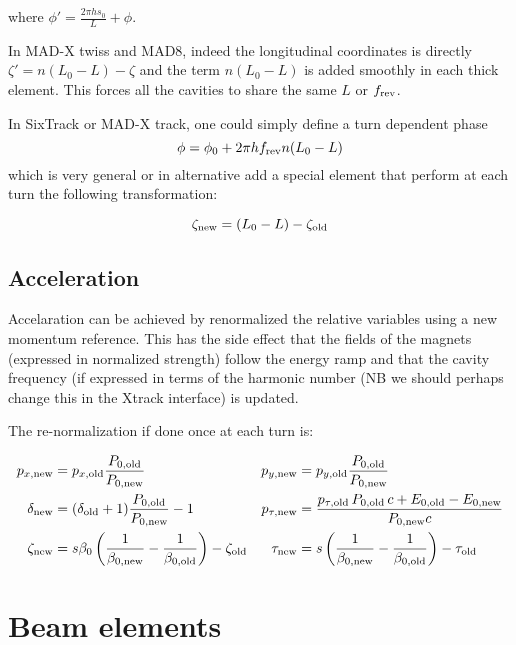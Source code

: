 where $\phi'=\frac{2\pi h s_0}{L} + \phi$.


In MAD-X twiss and MAD8, indeed the longitudinal coordinates is directly $\zeta'=n(L_0-L) -\zeta$ and the term $n(L_0-L)$ is added smoothly in each thick element. This forces all the cavities to share the same $L$ or $f_{\rm rev}$.

In SixTrack or MAD-X track, one could simply define a turn dependent phase
\begin{equation}
\phi=\phi_0 + 2 \pi h f_{\rm rev} n(L_0-L)
\end{equation}
which is very general or in alternative add a special element that perform at each turn the following transformation:

\begin{equation}
\zeta_{\rm new}=(L_0-L) -\zeta_{\rm old} 
\end{equation}

\subsection{Acceleration}

Accelaration can be achieved by renormalized the relative variables using a new momentum reference. This has the side effect that the fields of the magnets (expressed in normalized strength) follow the energy ramp and that the cavity frequency (if expressed in terms of the harmonic number (NB we should perhaps change this in the Xtrack interface) is updated.

The re-normalization if done once at each turn is:

\begin{align}
p_{x,\rm new} &= p_{x,\rm old} \frac{P_{0,\rm old}}{P_{0,\rm new}} &
p_{y,\rm new} &= p_{y,\rm old} \frac{P_{0,\rm old}}{P_{0,\rm new}} \\
\delta_{\rm new}&= (\delta_{\rm old}+1) \frac{P_{0,\rm old}}{P_{0,\rm new}} -1 &
p_{\tau,\rm new} &= \frac{p_{\tau,\rm old}\, P_{0,\rm old}\,c + E_{0,\rm old} - E_{0,\rm new}}{P_{0,\rm new}c} \\
\zeta_{\rm new} &= s\beta_0 \left(\frac{1}{\beta_{0,\rm new}} -
\frac{1}{\beta_{0,\rm old}}\right) - \zeta_{\rm old} &
\tau_{\rm new} &= s\left(\frac{1}{\beta_{0,\rm new}} -  \frac{1}{\beta_{0,\rm old}}\right) - \tau_{\rm old} \\
\end{align}





\section{Beam elements}

